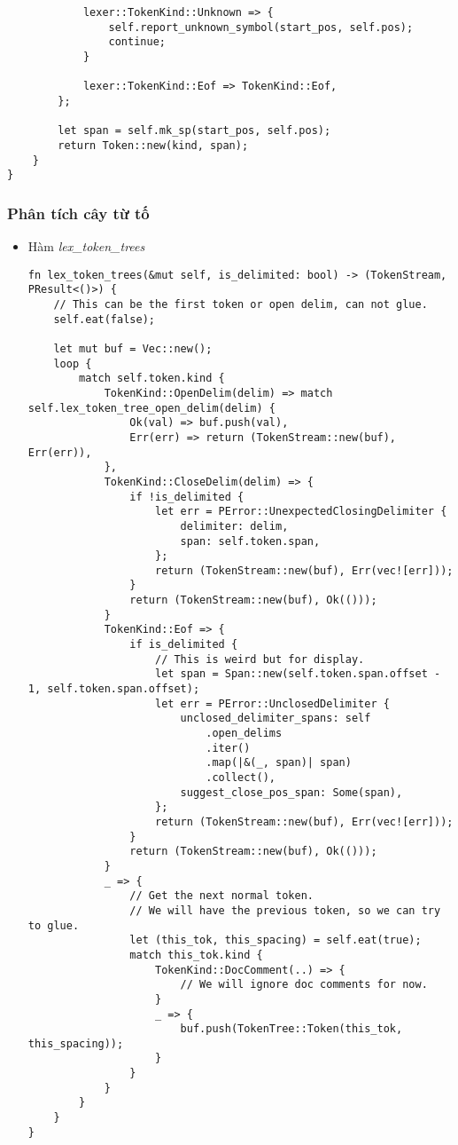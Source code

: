 {\begin{itemize}
\begin{lstlisting}
            lexer::TokenKind::Unknown => {
                self.report_unknown_symbol(start_pos, self.pos);
                continue;
            }

            lexer::TokenKind::Eof => TokenKind::Eof,
        };

        let span = self.mk_sp(start_pos, self.pos);
        return Token::new(kind, span);
    }
}
\end{lstlisting}
\end{itemize}

\subsubsection{Phân tích cây từ tố}
\begin{itemize}
    \item \label{ap1:token_tree_lex_token_trees}Hàm \textit{lex\_token\_trees}
\begin{lstlisting}
fn lex_token_trees(&mut self, is_delimited: bool) -> (TokenStream, PResult<()>) {
    // This can be the first token or open delim, can not glue.
    self.eat(false);

    let mut buf = Vec::new();
    loop {
        match self.token.kind {
            TokenKind::OpenDelim(delim) => match self.lex_token_tree_open_delim(delim) {
                Ok(val) => buf.push(val),
                Err(err) => return (TokenStream::new(buf), Err(err)),
            },
            TokenKind::CloseDelim(delim) => {
                if !is_delimited {
                    let err = PError::UnexpectedClosingDelimiter {
                        delimiter: delim,
                        span: self.token.span,
                    };
                    return (TokenStream::new(buf), Err(vec![err]));
                }
                return (TokenStream::new(buf), Ok(()));
            }
            TokenKind::Eof => {
                if is_delimited {
                    // This is weird but for display.
                    let span = Span::new(self.token.span.offset - 1, self.token.span.offset);
                    let err = PError::UnclosedDelimiter {
                        unclosed_delimiter_spans: self
                            .open_delims
                            .iter()
                            .map(|&(_, span)| span)
                            .collect(),
                        suggest_close_pos_span: Some(span),
                    };
                    return (TokenStream::new(buf), Err(vec![err]));
                }
                return (TokenStream::new(buf), Ok(()));
            }
            _ => {
                // Get the next normal token.
                // We will have the previous token, so we can try to glue.
                let (this_tok, this_spacing) = self.eat(true);
                match this_tok.kind {
                    TokenKind::DocComment(..) => {
                        // We will ignore doc comments for now.
                    }
                    _ => {
                        buf.push(TokenTree::Token(this_tok, this_spacing));
                    }
                }
            }
        }
    }
}
\end{lstlisting}


\end{itemize}}
